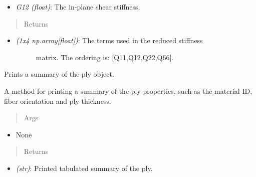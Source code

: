 \documentclass[letterpaper,10pt,english]{sphinxmanual}
\begin{document}
\begin{fulllineitems}
\begin{fulllineitems}
\begin{itemize}
\item {} 
\emph{G12 (float)}: The in-plane shear stiffness.

\end{itemize}
\begin{quote}\begin{description}
\item[{Returns}] \leavevmode
\end{description}\end{quote}
\begin{itemize}
\item {} \begin{description}
\item[{\emph{(1x4 np.array{[}float{]})}: The terms used in the reduced stiffness}] \leavevmode
matrix. The ordering is: {[}Q11,Q12,Q22,Q66{]}.

\end{description}

\end{itemize}

\end{fulllineitems}


\begin{fulllineitems}
\label{structures:AeroComBAT.Structures.Ply.printSummary}
Prints a summary of the ply object.

A method for printing a summary of the ply properties, such as
the material ID, fiber orientation and ply thickness.
\begin{quote}\begin{description}
\item[{Args}] \leavevmode
\end{description}\end{quote}
\begin{itemize}
\item {} 
None

\end{itemize}
\begin{quote}\begin{description}
\item[{Returns}] \leavevmode
\end{description}\end{quote}
\begin{itemize}
\item {} 
\emph{(str)}: Printed tabulated summary of the ply.

\end{itemize}

\end{fulllineitems}


\end{fulllineitems}
\end{document}
